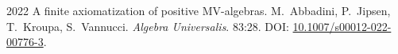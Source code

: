 \pubrow
  {2022}
  {\label{i:posMV}A finite axiomatization of positive MV-algebras.}
  {M.\ Abbadini, P.\ Jipsen, T.\ Kroupa, S.\ Vannucci.}
  {\emph{Algebra Universalis}. 83:28. DOI: \href{https://doi.org/10.1007/s00012-022-00776-3}{10.1007/s00012-022-00776-3}.}
